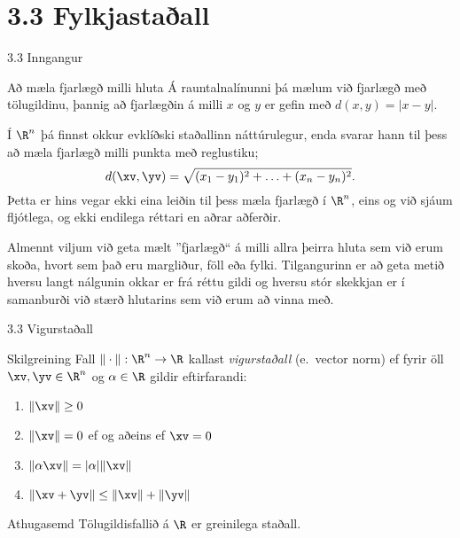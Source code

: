 
\section*{3.3 Fylkjastaðall}

\begin{frame}{3.3 Inngangur}
 \begin{block}{Að mæla fjarlægð milli hluta}
    Á rauntalnalínunni þá mælum við fjarlægð með tölugildinu,
    þannig að fjarlægðin á milli $x$ og $y$ er gefin með
    $d(x,y)=|x-y|$. 

\pause\smallskip

  Í $\R^n$ þá finnst okkur evklíðski staðallinn náttúrulegur, enda svarar  
  hann til þess að mæla fjarlægð milli punkta með reglustiku;
  $$
    d(\xv,\yv) = \sqrt{ (x_1-y_1)^2 + \ldots + (x_n-y_n)^2 }.
  $$\pause
  Þetta er hins vegar ekki eina leiðin til þess mæla fjarlægð
í $\R^n$, eins og við sjáum fljótlega, og ekki endilega réttari 
en aðrar aðferðir.

\pause\smallskip
  
  Almennt viljum við geta mælt ''fjarlægð`` á milli allra þeirra hluta
sem við erum skoða, hvort sem það eru margliður, föll eða fylki.
Tilgangurinn er að geta metið hversu langt nálgunin okkar er frá
réttu gildi og hversu stór skekkjan er í samanburði við stærð
hlutarins sem við erum að vinna með.

 \end{block}
\end{frame}


\begin{frame}{3.3 Vigurstaðall}
 
\begin{block}{Skilgreining}
 Fall $\| \cdot\|:\R^n \to \R$ kallast \emph{vigurstaðall} (e.~vector norm)
ef fyrir öll $\xv,\yv\in \R^n$ og $\alpha \in \R$ gildir eftirfarandi:\pause
\begin{enumerate}
 \item $\|\xv\| \geq 0$\pause
 \item $\|\xv\| = 0$ ef og aðeins ef $\xv = 0$\pause
 \item $\|\alpha\xv\| = |\alpha|\|\xv\|$\pause
 \item $\|\xv+\yv\| \leq \|\xv\| + \|\yv\|$
\end{enumerate}
\end{block}

\pause

\begin{block}{Athugasemd}
 Tölugildisfallið á $\R$ er greinilega staðall. 
\end{block}
\end{frame}

